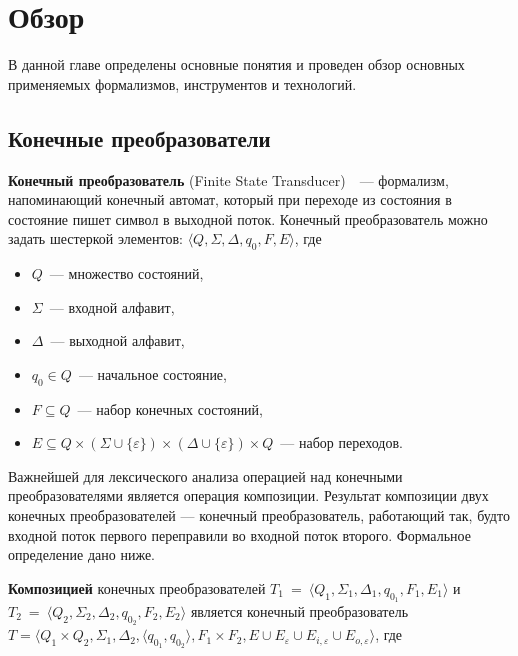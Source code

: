 \section{Обзор}
В данной главе определены основные понятия и проведен обзор основных применяемых формализмов, инструментов и технологий.

\subsection{Конечные преобразователи}
\textbf{Конечный преобразователь} (Finite State Transducer)~\cite{FST}~--- формализм, напоминающий конечный автомат, который при переходе из состояния в состояние пишет символ в выходной поток.
Конечный преобразователь можно задать шестеркой элементов: 
$\langle Q, \Sigma, \Delta, q_0, F, E \rangle$, где

\begin{itemize}
\item $Q$~--- множество состояний, 
\item $\Sigma$~--- входной алфавит, 
\item $\Delta$~--- выходной алфавит, 
\item $q_0 \in Q$~--- начальное состояние, 
\item $F \subseteq Q$~--- набор конечных состояний, 
\item $E \subseteq Q \times (\Sigma \cup \{\varepsilon\}) \times (\Delta \cup \{\varepsilon\})  \times Q$~--- набор переходов. 
\end{itemize}

Важнейшей для лексического анализа операцией над конечными преобразователями является операция композиции. Результат композиции двух конечных преобразователей — конечный преобразователь, работающий так, будто входной поток первого переправили во входной поток второго. Формальное определение дано ниже.

\textbf{Композицией} конечных преобразователей 
$T_1~=~\langle Q_1, \Sigma_1, \Delta_1, q_{0_{1}}, F_1, E_1 \rangle$ и $T_2~=~\langle Q_2, \Sigma_2, \Delta_2, q_{0_{2}}, F_2, E_2 \rangle$ является конечный преобразователь  $T =\langle Q_1  \times Q_2, \Sigma_1, \Delta_2, \langle q_{0_{1}}, q_{0_{2}} \rangle, F_1 \times F_2, E \cup E_{\varepsilon} \cup E_{i,\varepsilon} \cup E_{o,\varepsilon} \rangle$, где 

